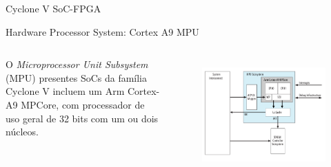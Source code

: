 \documentclass[10pt]{beamer}
\begin{document}
\begin{frame}{Cyclone V SoC-FPGA}
	\begin{alertblock}{Hardware Processor System: Cortex A9 MPU}
		\begin{columns}
			O \textit{Microprocessor Unit Subsystem} (MPU) presentes SoCs da família Cyclone V incluem um Arm Cortex-A9 MPCore, com processador de uso geral de 32 bits com um ou dois núcleos.
			\begin{figure}[h]
				\begin{center}
					\includegraphics[scale=0.217]{imagens/mpusubsystem.png}\\
				\end{center}
				\label{fig:cycloneV}
			\end{figure}
		\end{columns}
	\end{alertblock}
\end{frame}
\end{document}
